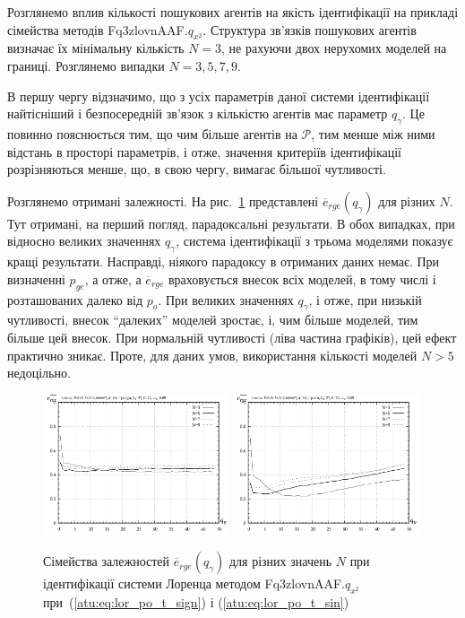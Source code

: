 Розглянемо вплив кількості пошукових агентів на якість
ідентифікації на прикладі сімейства методів
Fq3zlovnAAF.$q_{x^2}$.
Структура зв'язків пошукових агентів визначає їх мінімальну кількість
$ N = 3 $, не рахуючи двох нерухомих моделей на границі. Розглянемо
випадки $ N = 3,5,7,9 $.

В першу чергу відзначимо, що з усіх параметрів даної системи
ідентифікації найтісніший і безпосередній зв'язок з кількістю
агентів має параметр $ q_\gamma $.
Це повинно пояснюється тим, що чим більше агентів на
$ \mathcal{P} $, тим менше між ними відстань в просторі параметрів, і
отже, значення критеріїв ідентифікації розрізняються менше,
що, в свою чергу, вимагає більшої чутливості.

Розглянемо отримані залежності. На рис.~\ref{atu:f:lor_N_rge} представлені
$ \overline{e}_{rge} (q_\gamma) $ для різних
$ N $. Тут отримані, на перший погляд, парадоксальні результати. В
обох випадках, при відносно великих значеннях
$ q_\gamma $, система ідентифікації з трьома моделями показує кращі
результати. Насправді, ніякого парадоксу в отриманих даних
немає. При визначенні
$ p_{ge} $, а отже, а
$ \overline{e}_{rge} $ враховується внесок всіх моделей, в тому числі і
розташованих далеко від
$ p_o $. При великих значеннях
$ q_\gamma $, і отже, при низькій чутливості, внесок ``далеких''
моделей зростає, і, чим більше моделей, тим більше цей
внесок. При нормальній чутливості (ліва частина графіків), цей
ефект практично зникає. Проте, для даних умов, використання
кількості моделей
$ N> 5 $ недоцільно.



\begin{figure}[ht!]
  \centerline{
    \includegraphics[width=0.49\textwidth]{p/cha/lor/Fq3zlovnAAF/N/lor_Fq3zlovnAAF_qx2_p_qg_e_rge_sign.png}
    \hfill
    \includegraphics[width=0.49\textwidth]{p/cha/lor/Fq3zlovnAAF/N/lor_Fq3zlovnAAF_qx2_p_qg_e_rge_sin.png}
  }
\caption{Сімейства залежностей $ \overline{e}_{rge} (q_\gamma) $ для різних значень $ N $ при ідентифікації системи Лоренца методом Fq3zlovnAAF.$ q_{x^2} $ при~(\ref{atu:eq:lor_po_t_sign}) і (\ref{atu:eq:lor_po_t_sin})}
\label{atu:f:lor_N_rge}
\end{figure}


